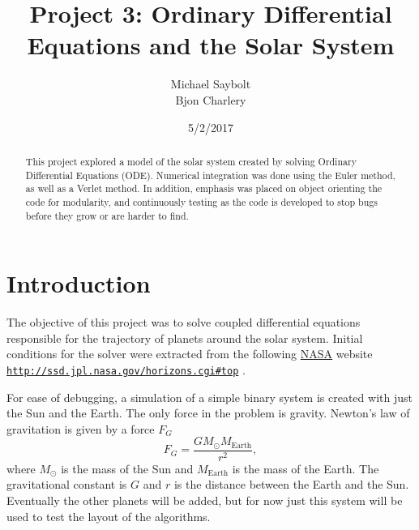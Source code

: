 \documentclass[12pt]{article} %
\begin{document}
\title{Project 3: Ordinary Differential Equations and the Solar System}
\author{Michael Saybolt \\ Bjon Charlery}

\date{5/2/2017}
\maketitle
\pagebreak

\tableofcontents

\begin{abstract}
This project explored a model of the solar system created by solving Ordinary Differential Equations (ODE). Numerical integration was done using the Euler method, as well as a Verlet method. In addition, emphasis was placed on object orienting the code for modularity, and continuously testing as the code is developed to stop bugs before they grow or are harder to find.
\end{abstract}

\pagebreak %

\section{Introduction} %
\indent The objective of this project was to solve coupled differential equations responsible for the trajectory of planets around the solar system. Initial conditions for the solver were extracted from the following 
\href{{http://www.nasa.gov/index.html}}{NASA} 
website 
\href{{http://ssd.jpl.nasa.gov/horizons.cgi#top}}{\nolinkurl{http://ssd.jpl.nasa.gov/horizons.cgi\#top}}
.

%

For ease of debugging, a simulation of a simple binary system is created with just the Sun and the Earth.
The only force in the problem is gravity. Newton's law of gravitation  is given by a force $F_G$
\begin{equation} %
F_G=\frac{GM_{\odot}M_{\mathrm{Earth}}}{r^2},
\label{eq:newtong}
\end{equation}
where $M_{\odot}$ is the mass of the Sun and $M_{\mathrm{Earth}}$ is the mass of the Earth. The gravitational constant is $G$ and $r$ is the distance between the Earth and the Sun. Eventually the other planets will be added, but for now just this system will be used to test the layout of the algorithms.
\end{document}
